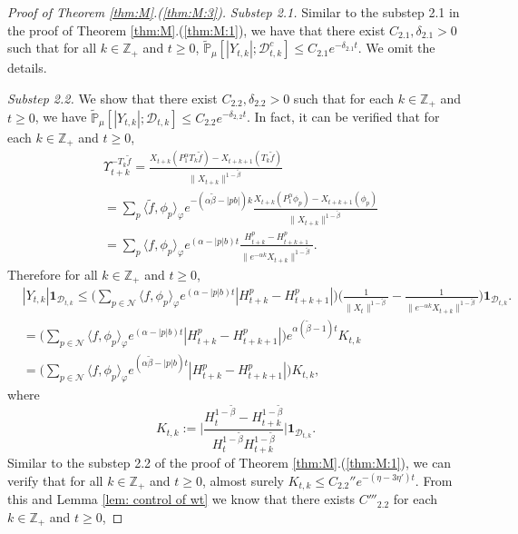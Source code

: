 \documentclass[12pt,a4paper]{amsart}
\theoremstyle{plain}
\theoremstyle{definition}
\numberwithin{equation}{section}
\begin{document}
\begin{proof}[Proof of Theorem \ref{thm:M}.(\ref{thm:M:3})]
\emph{Substep 2.1.} Similar to the substep 2.1 in the proof of Theorem \ref{thm:M}.(\ref{thm:M:1}), we have that there exist $C_{2.1},\delta_{2.1} >0$ such that for all $k \in \mathbb Z_+$ and $t\geq 0$,
\(
\mathbb{\widetilde{P}}_{\mu}[|Y_{t,k}|;\mathcal{D}^c_{t,k}]
\leq C_{2.1} e^{-\delta_{2.1} t}.
\)
We omit the details.

\emph{Substep 2.2.} We show that there exist $C_{2.2}, \delta_{2.2}>0$ such that for each $k \in \mathbb Z_+$ and $t\geq 0$, we have $\widetilde {\mathbb {P}}_\mu[|Y_{t,k}|; \mathcal D_{t,k}]\leq C_{2.2}e^{- \delta_{2,2} t}$.
In fact, it can be verified that for each $k \in \mathbb Z_+$ and $t\geq 0$, 
\begin{align}
& \Upsilon_{t+k}^{-T_k\tilde f} 
  = \frac{X_{t+k}(P^\alpha_1T_k\tilde f) - X_{t+k+1}(T_k \tilde f)}{\|X_{t+k}\|^{1 - \tilde \beta}}
  \\& = \sum_{p}\langle\tilde f,\phi_p\rangle_\varphi e^{-(\alpha \tilde \beta - |pb|)k}\frac{ X_{t+k}(P_1^\alpha \phi_p) - X_{t+k+1}(\phi_p)}{\|X_{t+k}\|^{1 - \tilde \beta}}
  \\& = \sum_{p}\langle f,\phi_p\rangle_\varphi  e^{(\alpha  -|p|b)t}\frac{H_{t+k}^p-H_{t+k+1}^p }{\|e^{-\alpha k}X_{t+k}\|^{1 - \tilde \beta}}. 
\end{align}
Therefore for all $k\in \mathbb Z_+$ and $t\geq 0$,
\begin{align}
  &|Y_{t,k}| \mathbf 1_{\mathcal D_{t,k}}
  \leq \Big( \sum_{p\in \mathcal N}\langle f,\phi_p\rangle_\varphi  e^{(\alpha  -|p|b)t} | H_{t+k}^p-H_{t+k+1}^p |\Big) \Big( \frac{1}{\|X_t\|^{1 - \tilde \beta}} - \frac{1}{\|e^{-\alpha k}X_{t+k}\|^{1 - \tilde \beta}} \Big)\mathbf 1_{\mathcal D_{t,k}}. 
  \\ &= \Big( \sum_{p\in \mathcal N}\langle f,\phi_p\rangle_\varphi  e^{(\alpha  -|p|b)t} | H_{t+k}^p-H_{t+k+1}^p |\Big)e^{\alpha (\tilde \beta - 1)t} K_{t,k}
  \\ &= \Big( \sum_{p\in \mathcal N}\langle f,\phi_p\rangle_\varphi  e^{(\alpha \tilde \beta  -|p|b)t} | H_{t+k}^p-H_{t+k+1}^p |\Big) K_{t,k},
\end{align}
where
\[
  K_{t,k}
  := \Big| \frac {H_t^{1- \tilde \beta} - H_{t+k}^{1 - \tilde \beta}} {H_t^{1 - \tilde \beta} H_{t+k}^{ 1- \tilde \beta }} \Big| \mathbf{1}_{\mathcal{D}_{t,k}}.
\]
Similar to the substep 2.2 of the proof of Theorem \ref{thm:M}.(\ref{thm:M:1}), we can verify that for all $k\in \mathbb Z_+$ and $t\geq 0$, almost surely $K_{t,k} \leq C_{2.2}'' e^{- (\eta - 3\eta')t}$.
From this and Lemma \ref{lem: control of wt} we know that there exists $C'''_{2.2}$ for each $k\in \mathbb Z_+$ and $t\geq 0$,

\end{proof}
\end{document}
